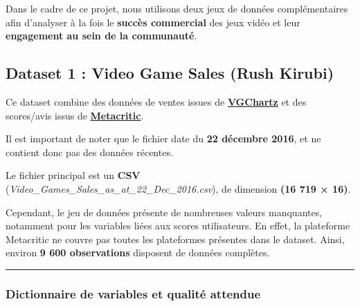 \documentclass[
]{article}
\begin{document}
Dans le cadre de ce projet, nous utilisons deux jeux de données
complémentaires afin d'analyser à la fois le \textbf{succès commercial}
des jeux vidéo et leur \textbf{engagement au sein de la communauté}.

\subsection{Dataset 1 : Video Game Sales (Rush
Kirubi)}\label{dataset-1-video-game-sales-rush-kirubi}

Ce dataset combine des données de ventes issues de
\href{https://www.vgchartz.com/}{\textbf{VGChartz}} et des scores/avis
issus de \href{https://www.metacritic.com/}{\textbf{Metacritic}}.

Il est important de noter que le fichier date du \textbf{22 décembre
2016}, et ne contient donc pas des données récentes.

Le fichier principal est un \textbf{CSV}
(\emph{Video\_Games\_Sales\_as\_at\_22\_Dec\_2016.csv}), de dimension
\textbf{(16 719 × 16)}.

Cependant, le jeu de données présente de nombreuses valeurs manquantes,
notamment pour les variables liées aux scores utilisateurs. En effet, la
plateforme Metacritic ne couvre pas toutes les plateformes présentes
dans le dataset. Ainsi, environ \textbf{9 600 observations} disposent de
données complètes.

\begin{center}\rule{0.5\linewidth}{0.5pt}\end{center}

\subsubsection{Dictionnaire de variables et qualité
attendue}\label{dictionnaire-de-variables-et-qualituxe9-attendue}
\end{document}

